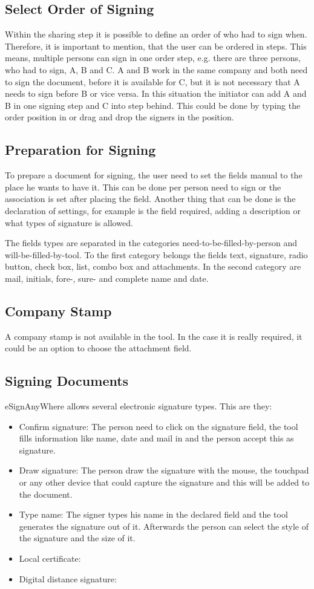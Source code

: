\subsection{Select Order of Signing}
Within the sharing step it is possible to define an order of who had to sign when. Therefore, it is important to mention, that the user can be ordered in steps. This means, multiple persons can sign in one order step, e.g. there are three persons, who had to sign, A, B and C. A and B work in the same company and both need to sign the document, before it is available for C, but it is not necessary that A needs to sign before B or vice versa. In this situation the initiator can add A and B in one signing step and C into step behind. This could be done by typing the order position in or drag and drop the signers in the position. 

\subsection{Preparation for Signing}
To prepare a document for signing, the user need to set the fields manual to the place he wants to have it. This can be done per person need to sign or the association is set after placing the field. Another thing that can be done is the declaration of settings, for example is the field required, adding a description or what types of signature is allowed.

The fields types are separated in the categories need-to-be-filled-by-person and will-be-filled-by-tool. To the first category belongs the fields text, signature, radio button, check box, list, combo box and attachments. In the second category are mail, initials, fore-, sure- and complete name and date.

\subsection{Company Stamp}
A company stamp is not available in the tool. In the case it is really required, it could be an option to choose the attachment field.
 
\subsection{Signing Documents}
eSignAnyWhere allows several electronic signature types. This are they:
\begin{itemize}
	\item Confirm signature: The person need to click on the signature field, the tool fills information like name, date and mail in and the person accept this as signature.
	\item Draw signature: The person draw the signature with the mouse, the touchpad or any other device that could capture the signature and this will be added to the document.
	\item Type name: The signer types his name in the declared field and the tool generates the signature out of it. Afterwards the person can select the style of the signature and the size of it.
	\item Local certificate:
	\item Digital distance signature:
\end{itemize}

